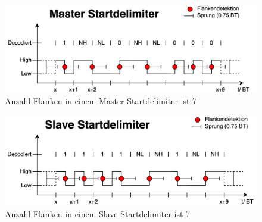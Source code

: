 \begin{figure}[H]
    \centering
    \includegraphics[width=\linewidth]{Figures/Chap3/Busauslastung/Master_Startdel.png}
    \caption{Anzahl Flanken in einem Master Startdelimiter ist 7}
    \label{fig:MasterStartdel}
\end{figure}

\begin{figure}[H]
    \centering
    \includegraphics[width=\linewidth]{Figures/Chap3/Busauslastung/Slave_Startdel.png}
    \caption{Anzahl Flanken in einem Slave Startdelimiter ist 7}
    \label{fig:SlaveStartdel}
\end{figure}

\newpage






\newpage





